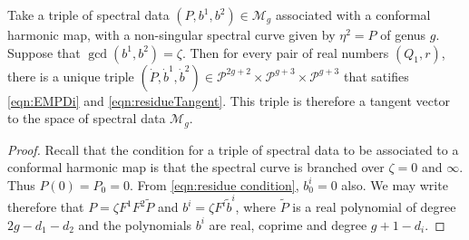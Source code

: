\begin{lem}[Case (v)]
    \label{lem:tangent conformal}
Take a triple of spectral data $(P,b^1,b^2)\in\mathcal{M}_g$ associated with a conformal harmonic map, with a non-singular spectral curve given by $η^2 = P$ of genus $g$. Suppose that $\gcd(b^1,b^2) = ζ$. Then for every pair of real numbers $(Q_1,r)$, there is a unique triple $(\dot P, \dot b^1, \dot b^2) \in \mathcal{P}^{2g+2}\times\mathcal{P}^{g+3}\times\mathcal{P}^{g+3}$ that satifies \eqref{eqn:EMPDi} and \eqref{eqn:residueTangent}. This triple is therefore a tangent vector to the space of spectral data $\mathcal{M}_g$.

\begin{proof}
Recall that the condition for a triple of spectral data to be associated to a conformal harmonic map is that the spectral curve is branched over $ζ=0$ and $\infty$. Thus $P(0) = P_0 =0$. From \eqref{eqn:residue condition}, $b^i_0 = 0$ also. We may write therefore that $P= ζF^1F^2\tilde{P}$ and $b^i = ζF^i \tilde{b}^i$, where $\tilde{P}$ is a real polynomial of degree $2g - d_1 - d_2$ and the polynomials $b^i$ are real, coprime and degree $g+1-d_i$.


\end{proof}
\end{lem}
